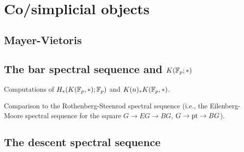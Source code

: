 \chapter{Co/simplicial objects}

\section{Mayer-Vietoris}

\section{The bar spectral sequence and $K(\mathbb{F}_p; *)$}

Computations of $H_*(K(\mathbb{F}_p, *); \mathbb{F}_p)$ and $K(n)_* K(\mathbb{F}_p, *)$.

Comparison to the Rothenberg-Steenrod spectral sequence (i.e., the Eilenberg-Moore spectral sequence for the square $G \to EG \to BG$, $G \to \operatorname{pt} \to BG$).

\section{The descent spectral sequence}


